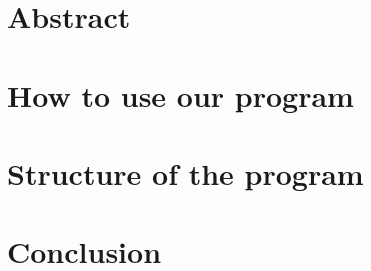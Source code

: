 \documentclass{report}
\begin{document}


\chapter*{Abstract}


\tableofcontents

\chapter{How to use our program}


\chapter{Structure of the program}


\chapter*{Conclusion}


\listofalgorithms
{}
\end{document}
